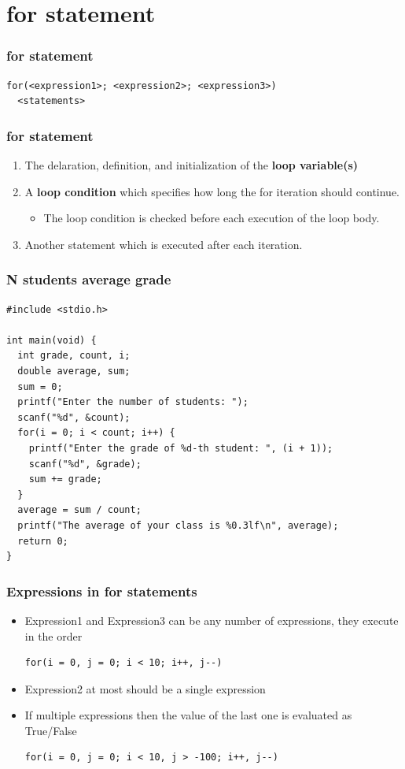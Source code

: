 \documentclass{../c-lecture}
\begin{document}
\section{for statement}

\begin{frame}[fragile]
  \frametitle{for statement}
  \begin{verbatim}
for(<expression1>; <expression2>; <expression3>)
  <statements>
  \end{verbatim}
\end{frame}

\begin{frame}
  \frametitle{for statement}
  \begin{enumerate}
    \item The delaration, definition, and initialization of the \textbf{loop variable(s)}
    \item A \textbf{loop condition} which specifies how long the for iteration should continue.
    \begin{itemize}
      \item The loop condition is checked before each execution of the loop body.
    \end{itemize}
    \item Another statement which is executed after each iteration.
  \end{enumerate}
\end{frame}

\begin{frame}[fragile]
  \frametitle{N students average grade}
  \scriptsize
  \begin{verbatim}
#include <stdio.h>

int main(void) {
  int grade, count, i;
  double average, sum;
  sum = 0;
  printf("Enter the number of students: ");
  scanf("%d", &count);
  for(i = 0; i < count; i++) {
    printf("Enter the grade of %d-th student: ", (i + 1));
    scanf("%d", &grade);
    sum += grade;
  }
  average = sum / count;
  printf("The average of your class is %0.3lf\n", average);
  return 0;
}
  \end{verbatim}
\end{frame}

\begin{frame}[fragile]
  \frametitle{Expressions in for statements}
  \begin{itemize}
    \item
      Expression1 and Expression3 can be any number of expressions, they execute
      in the order
    \begin{verbatim}
for(i = 0, j = 0; i < 10; i++, j--)
    \end{verbatim}
    \item Expression2 at most should be a single expression
    \item
      If multiple expressions then the value of the last one is evaluated as
      True/False
    \begin{verbatim}
for(i = 0, j = 0; i < 10, j > -100; i++, j--)
    \end{verbatim}
  \end{itemize}
\end{frame}
\end{document}
